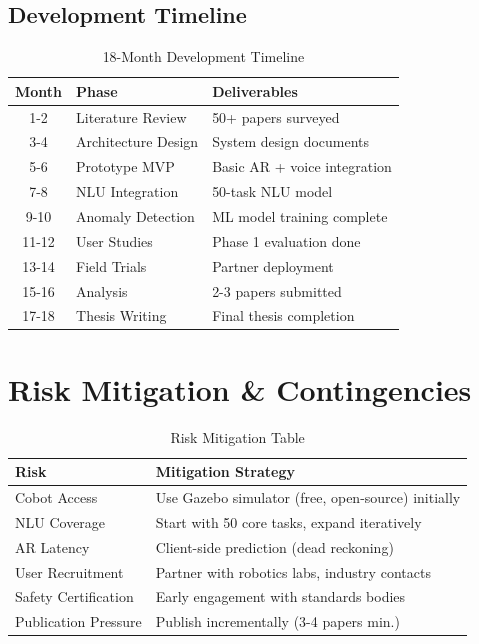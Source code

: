 \documentclass[12pt,a4paper,oneside]{book}
\begin{document}
\section{Development Timeline}

\begin{table}[H]
\centering
\begin{tabular}{|c|l|l|}
\hline
\textbf{Month} & \textbf{Phase} & \textbf{Deliverables} \\
\hline
1-2 & Literature Review & 50+ papers surveyed \\
3-4 & Architecture Design & System design documents \\
5-6 & Prototype MVP & Basic AR + voice integration \\
7-8 & NLU Integration & 50-task NLU model \\
9-10 & Anomaly Detection & ML model training complete \\
11-12 & User Studies & Phase 1 evaluation done \\
13-14 & Field Trials & Partner deployment \\
15-16 & Analysis & 2-3 papers submitted \\
17-18 & Thesis Writing & Final thesis completion \\
\hline
\end{tabular}
\caption{18-Month Development Timeline}
\end{table}

\newpage

\chapter{Risk Mitigation \& Contingencies}

\begin{table}[H]
\centering
\begin{tabular}{|p{3cm}|p{5cm}|}
\hline
\textbf{Risk} & \textbf{Mitigation Strategy} \\
\hline
Cobot Access & Use Gazebo simulator (free, open-source) initially \\
NLU Coverage & Start with 50 core tasks, expand iteratively \\
AR Latency & Client-side prediction (dead reckoning) \\
User Recruitment & Partner with robotics labs, industry contacts \\
Safety Certification & Early engagement with standards bodies \\
Publication Pressure & Publish incrementally (3-4 papers min.) \\
\hline
\end{tabular}
\caption{Risk Mitigation Table}
\end{table}
\end{document}
